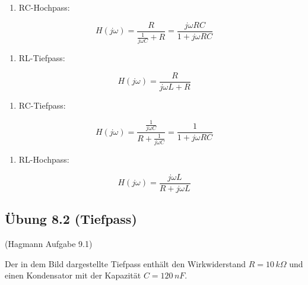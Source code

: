 \documentclass[
  ngerman,
  letterpaper,
]{scrbook}
\providecommand{\tightlist}{%
  \setlength{\itemsep}{0pt}\setlength{\parskip}{0pt}}
\begin{document}
\begin{tcolorbox}[enhanced jigsaw, titlerule=0mm, rightrule=.15mm, toprule=.15mm, colback=white, toptitle=1mm, bottomrule=.15mm, coltitle=black, leftrule=.75mm, arc=.35mm, colbacktitle=quarto-callout-caution-color!10!white, opacityback=0, bottomtitle=1mm, colframe=quarto-callout-caution-color-frame, opacitybacktitle=0.6, breakable, title=\textcolor{quarto-callout-caution-color}{\faFire}\hspace{0.5em}{Lösung 8.1}, left=2mm]

\begin{enumerate}
\def\labelenumi{\alph{enumi})}
\tightlist
\item
  RC-Hochpass:
\end{enumerate}

\[H(j\omega) = \frac{R}{\frac{1}{j\omega C} + R} = \frac{j\omega RC}{1 + j\omega RC}\]

\begin{enumerate}
\def\labelenumi{\alph{enumi})}
\setcounter{enumi}{1}
\tightlist
\item
  RL-Tiefpass:
\end{enumerate}

\[H(j\omega) = \frac{R}{j\omega L + R}\]

\begin{enumerate}
\def\labelenumi{\alph{enumi})}
\setcounter{enumi}{2}
\tightlist
\item
  RC-Tiefpass:
\end{enumerate}

\[H(j\omega) = \frac{\frac{1}{j\omega C}}{R + \frac{1}{j\omega C}} = \frac{1}{1 + j\omega RC}\]

\begin{enumerate}
\def\labelenumi{\alph{enumi})}
\setcounter{enumi}{3}
\tightlist
\item
  RL-Hochpass:
\end{enumerate}

\[H(j\omega) = \frac{j\omega L}{R + j\omega L}\]

\end{tcolorbox}

\subsection{Übung 8.2 (Tiefpass)}\label{uxfcbung-8.2-tiefpass}

(Hagmann Aufgabe 9.1)

Der in dem Bild dargestellte Tiefpass enthält den Wirkwiderstand
\(R = 10\,k\Omega\) und einen Kondensator mit der Kapazität
\(C = 120\,nF\).
\end{document}

